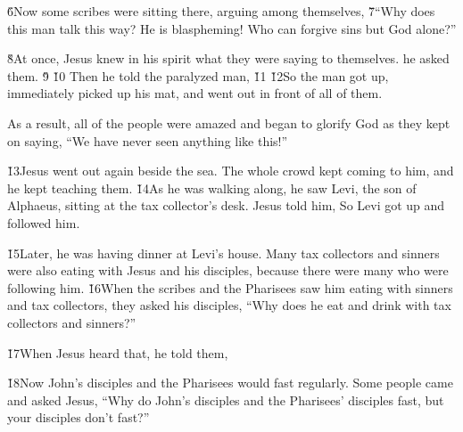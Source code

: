 \v{6}Now some scribes were sitting there, arguing among themselves, \v{7}``Why does this man talk this way? He is blaspheming! Who can forgive sins but God alone?''

\v{8}At once, Jesus knew in his spirit what they were saying to themselves.  he asked them. \v{9} \v{10} Then he told the paralyzed man, \v{11} \v{12}So the man got up, immediately picked up his mat, and went out in front of all of them.

As a result, all of the people were amazed and began to glorify God as they kept on saying, ``We have never seen anything like this!''

\v{13}Jesus went out again beside the sea. The whole crowd kept coming to him, and he kept teaching them. \v{14}As he was walking along, he saw Levi, the son of Alphaeus, sitting at the tax collector's desk. Jesus told him,  So Levi got up and followed him.

\v{15}Later, he was having dinner at Levi's house. Many tax collectors and sinners were also eating with Jesus and his disciples, because there were many who were following him. \v{16}When the scribes and the Pharisees saw him eating with sinners and tax collectors, they asked his disciples, ``Why does he eat and drink with tax collectors and sinners?''

\v{17}When Jesus heard that, he told them, 

\v{18}Now John's disciples and the Pharisees would fast regularly. Some people came and asked Jesus, ``Why do John's disciples and the Pharisees' disciples fast, but your disciples don't fast?''

